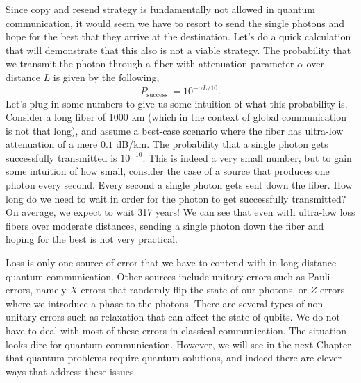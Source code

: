 Since copy and resend strategy is fundamentally not allowed in quantum communication, it would seem we have to resort to send the single photons and hope for the best that they arrive at the destination.
Let's do a quick calculation that will demonstrate that this also is not a viable strategy.
The probability that we transmit the photon through a fiber with attenuation parameter $\alpha$ over distance $L$ is given by the following,
\begin{equation}
    P_{\text {success }}=10^{-\alpha L / 10}.
\end{equation}
Let's plug in some numbers to give us some intuition of what this probability is.
Consider a long fiber of 1000 km (which in the context of global communication is not that long), and assume a best-case scenario where the fiber has ultra-low attenuation of a mere $0.1$ dB/km.
The probability that a single photon gets successfully transmitted is $10^{-10}$.
This is indeed a very small number, but to gain some intuition of how small, consider the case of a source that produces one photon every second.
Every second a single photon gets sent down the fiber.
How long do we need to wait in order for the photon to get successfully transmitted?
On average, we expect to wait 317 years!
We can see that even with ultra-low loss fibers over moderate distances, sending a single photon down the fiber and hoping for the best is not very practical.

Loss is only one source of error that we have to contend with in long distance quantum communication.
Other sources include unitary errors such as Pauli errors, namely $X$ errors that randomly flip the state of our photons, or $Z$ errors where we introduce a phase to the photons.
There are several types of non-unitary errors such as relaxation that can affect the state of qubits.
We do not have to deal with most of these errors in classical communication.
The situation looks dire for quantum communication.
However, we will see in the next Chapter that quantum problems require quantum solutions, and indeed there are clever ways that address these issues.





\newpage
\begin{exercises}




\end{exercises}

